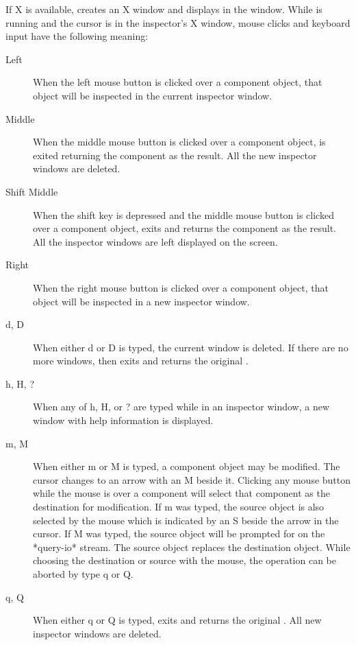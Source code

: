 If X is available,  creates an X window and displays
 in the window.  While  is running and the
cursor is in the inspector's X window, mouse clicks and keyboard input
have the following meaning:
\begin{description}

\item[Left]
When the left mouse button is clicked over a component object, that
object will be inspected in the current inspector window.

\item[Middle]
When the middle mouse button is clicked over a component object,
 is exited returning the component as the result.  All the new
inspector windows are deleted.

\item[Shift Middle]
When the shift key is depressed and the middle mouse button is
clicked over a component object,  exits and returns the component
as the result.  All the inspector windows are left displayed on the screen.

\item[Right]
When the right mouse button is clicked over a component object,
that object will be inspected in a new inspector window.

\item[d, D]
When either d or D is typed, the current window is
deleted.  If there are no more windows, then  exits and returns the
original .

\item[h, H, ?]
When any of h, H, or ? are typed while in an inspector window, a
new window with help information is displayed.

\item[m, M]
When either m or M is typed, a component object may be modified.  The
cursor changes to an arrow with an M beside it.  Clicking any mouse button
while the mouse is over a component will select that component as the
destination for modification.  If m was typed, the source object is also
selected by the mouse which is indicated by an S beside the arrow in the
cursor.  If M was typed, the source object will be prompted for on the
*query-io* stream.  The source object replaces the destination object.
While choosing the destination or source with the mouse, the operation can
be aborted by type q or Q.

\item[q, Q]
When either q or Q is typed,  exits and
returns the original .  All new inspector windows are deleted.


\end{description}
